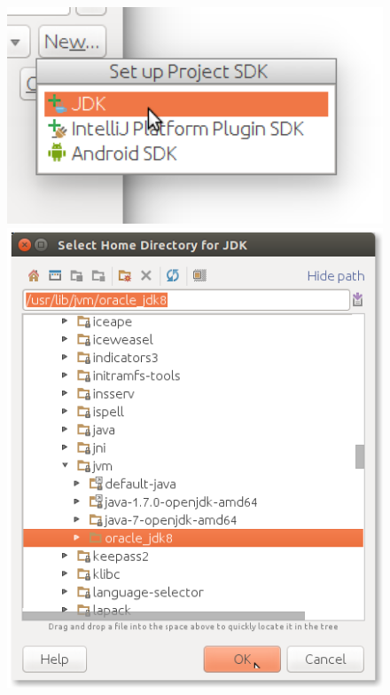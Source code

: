 \begin{enumerate}
\begin{figure}[H]
\begin{minipage}{0.27\textwidth}
\includegraphics[width=1.0\textwidth]{../img/intellij/idea-project-sdk-jvm.png} 
\end{minipage}
\begin{minipage}{0.35\textwidth}
\includegraphics[width=1.0\textwidth]{../img/intellij/idea-project-sdk-home.png} 
\end{minipage}

\end{figure}
\end{enumerate}
